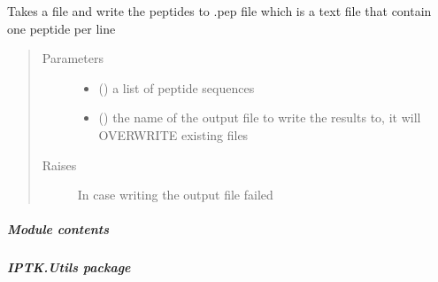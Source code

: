 \documentclass[letterpaper,10pt,english]{sphinxmanual}
\begin{document}

\begin{fulllineitems}
\label{\detokenize{IPTK.IO:IPTK.IO.OutFunctions.write_pep_file}}
Takes a file and write the peptides to .pep file which is a text file that contain one peptide per line
\begin{quote}\begin{description}
\item[{Parameters}] \leavevmode\begin{itemize}
\item {} 
 () \textendash{} a list of peptide sequences

\item {} 
 () \textendash{} the name of the output file to write the results to, it will OVERWRITE existing files

\end{itemize}

\item[{Raises}] \leavevmode
{} \textendash{} In case writing the output file failed

\end{description}\end{quote}

\end{fulllineitems}



\subparagraph{Module contents}
\label{\detokenize{IPTK.IO:module-IPTK.IO}}\label{\detokenize{IPTK.IO:module-contents}}

\subparagraph{IPTK.Utils package}
\label{\detokenize{IPTK.Utils:iptk-utils-package}}\label{\detokenize{IPTK.Utils::doc}}
\end{document}
